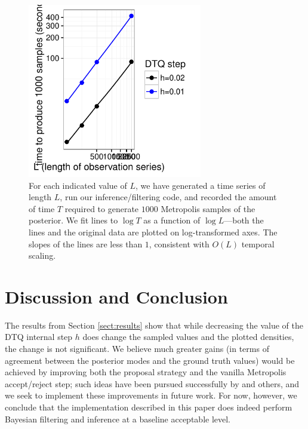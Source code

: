 \documentclass[wcp]{jmlr}
\begin{document}
\begin{figure}[th]
\begin{center}
\includegraphics[width=3in]{scaling}
\end{center}
\caption{For each indicated value of $L$, we have generated a time
  series of length $L$, run our inference/filtering code, and recorded
  the amount of time $T$ required to generate $1000$ Metropolis samples of
  the posterior.  We fit lines to $\log T$ as a function of $\log
  L$---both the lines and the original data are plotted on
  log-transformed axes.  The slopes of the lines are less than $1$,
  consistent with $O(L)$ temporal scaling.}
\label{fig:scaling}
\end{figure}


\section{Discussion and Conclusion}
\label{sect:conclusion}
The results from Section \ref{sect:results}
show that while decreasing the value of the DTQ internal step $h$ does
change the sampled values and the plotted densities, the change is not
significant.  We believe much greater gains (in terms of agreement
between the posterior modes and the ground truth values) would be achieved by
improving both the proposal strategy and the vanilla Metropolis
accept/reject step; such ideas have been pursued successfully by \citep{Fuchs2013} and others, and we seek
to implement these improvements in future work.  For now, however, we
conclude that the implementation described in this paper does indeed
perform Bayesian filtering and inference at a baseline acceptable
level.
\end{document}
